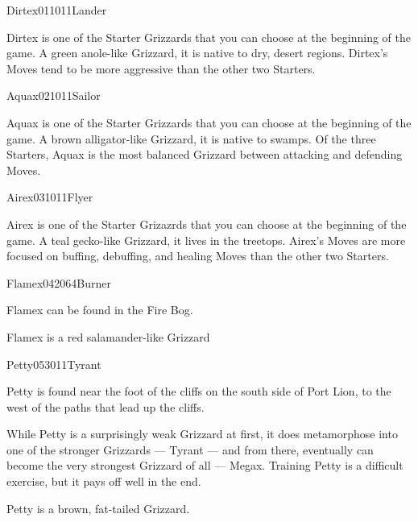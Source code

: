 \documentclass[10pt,twocolumn]{memoir}
\begin{document}
\begin{grizzardpage}{Dirtex}{01}{10}{1}{1}{Lander}

  Dirtex  is one  of the  Starter  Grizzards that  you can  choose at  the
  beginning of the game. A green anole-like Grizzard, it is native to dry,
  desert regions. Dirtex's Moves tend to be more aggressive than the other
  two Starters.

\end{grizzardpage}

\begin{grizzardpage}{Aquax}{02}{10}{1}{1}{Sailor}

  Aquax  is one  of  the Starter  Grizzards  that you  can  choose at  the
  beginning of the game. A brown  alligator-like Grizzard, it is native to
  swamps.  Of the  three Starters,  Aquax  is the  most balanced  Grizzard
  between attacking and defending Moves.

\end{grizzardpage}

\begin{grizzardpage}{Airex}{03}{10}{1}{1}{Flyer}

  Airex  is one  of the  Starter Grizazrds  that you  can choose  at the
  beginning of  the game. A  teal gecko-like  Grizzard, it lives  in the
  treetops. Airex's  Moves are more  focused on buffing,  debuffing, and
  healing Moves than the other two Starters.
  
\end{grizzardpage}

\begin{grizzardpage}{Flamex}{04}{20}{6}{4}{Burner}

  Flamex can be found in the Fire Bog.

  Flamex is a red salamander-like Grizzard
  
\end{grizzardpage}

\begin{grizzardpage}{Petty}{05}{30}{1}{1}{Tyrant}

  Petty is found near  the foot of the cliffs on the  south side of Port
  Lion, to the west of the paths that lead up the cliffs.

  While  Petty  is  a  surprisingly  weak Grizzard  at  first,  it  does
  metamorphose into  one of the stronger  Grizzards — Tyrant —  and from
  there,  eventually  can become  the  very  strongest Grizzard  of  all
  — Megax. Training Petty is a  difficult exercise, but it pays off well
  in the end.

  Petty is a brown, fat-tailed Grizzard.

\end{grizzardpage}
\end{document}
